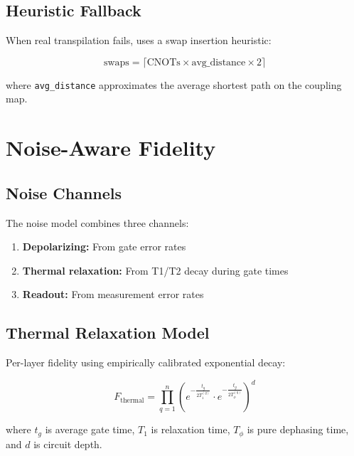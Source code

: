 \documentclass[11pt,a4paper]{article}
\begin{document}
\subsection{Heuristic Fallback}

When real transpilation fails, uses a swap insertion heuristic:

\begin{equation}
\text{swaps} = \lceil \text{CNOTs} \times \text{avg\_distance} \times 2 \rceil
\end{equation}

where \texttt{avg\_distance} approximates the average shortest path on the coupling map.

\section{Noise-Aware Fidelity}

\subsection{Noise Channels}

The noise model combines three channels:

\begin{enumerate}[leftmargin=2em]
    \item \textbf{Depolarizing:} From gate error rates
    \item \textbf{Thermal relaxation:} From T1/T2 decay during gate times
    \item \textbf{Readout:} From measurement error rates
\end{enumerate}

\subsection{Thermal Relaxation Model}

Per-layer fidelity using empirically calibrated exponential decay:

\begin{equation}
F_{\text{thermal}} = \prod_{q=1}^{n} \left( e^{-\frac{t_g}{2 T_1^{(q)}}} \cdot e^{-\frac{t_g}{2 T_{\phi}^{(q)}}} \right)^{d}
\end{equation}

where $t_g$ is average gate time, $T_1$ is relaxation time, $T_{\phi}$ is pure dephasing time, and $d$ is circuit depth.
\end{document}
